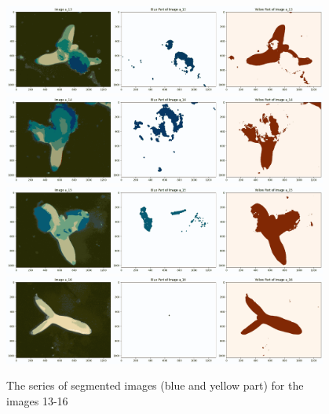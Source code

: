 \documentclass{article}
\begin{document}
\begin{figure}[h!]
\centering
\includegraphics[width=0.95\textwidth]{Report/Images/Appendix Images/ColorSegments/Image13.png}
\includegraphics[width=0.95\textwidth]{Report/Images/Appendix Images/ColorSegments/Image14.png}
\includegraphics[width=0.95\textwidth]{Report/Images/Appendix Images/ColorSegments/Image15.png}
\includegraphics[width=0.95\textwidth]{Report/Images/Appendix Images/ColorSegments/Image16.png}
\caption{The series of segmented images (blue and yellow part) for the images 13-16} 
\label{fig:segment13-16}
\end{figure}
\end{document}

